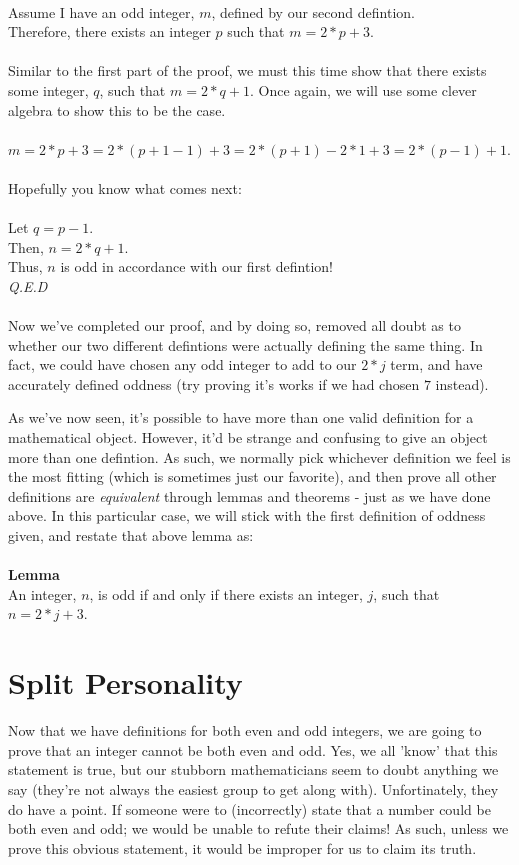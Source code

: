 \documentclass[a4paper,12pt]{article}
\begin{document}
\\
Assume I have an odd integer, $m$, defined by our second defintion.\\
Therefore, there exists an integer $p$ such that $m = 2*p + 3$.\\
\\
Similar to the first part of the proof, we must this time show that there exists some integer, $q$, such that $m = 2*q + 1$. Once again, we will use some clever algebra to show this to be the case.\\
\\
$m = 2*p + 3 = 2*(p + 1 - 1) + 3 = 2*(p + 1) - 2*1 + 3 = 2*(p - 1) + 1$.\\
\\
Hopefully you know what comes next:\\
\\
Let $q = p - 1$.\\
Then, $n = 2*q + 1$.\\
Thus, $n$ is odd in accordance with our first defintion!\\
\textit{Q.E.D}\\
\\
Now we've completed our proof, and by doing so, removed all doubt as to whether our two different defintions were actually defining the same thing. In fact, we could have chosen any odd integer to add to our $2*j$ term, and have accurately defined oddness (try proving it's works if we had chosen $7$ instead). 

As we've now seen, it's possible to have more than one valid definition for a mathematical object. However, it'd be strange and confusing to give an object more than one defintion. As such, we normally pick whichever definition we feel is the most fitting (which is sometimes just our favorite), and then prove all other definitions are \textit{equivalent} through lemmas and theorems - just as we have done above. In this particular case, we will stick with the first definition of oddness given, and restate that above lemma as:\\
\\
\textbf{Lemma}\\
An integer, $n$, is odd if and only if there exists an integer, $j$, such that $n = 2*j + 3$.   

\section{Split Personality}
Now that we have definitions for both even and odd integers, we are going to prove that an integer cannot be both even and odd. Yes, we all 'know' that this statement is true, but our stubborn mathematicians seem to doubt anything we say (they're not always the easiest group to get along with). Unfortinately, they do have a point. If someone were to (incorrectly) state that a number could be both even and odd; we would be unable to refute their claims! As such, unless we prove this obvious statement, it would be improper for us to claim its truth.
\end{document}
